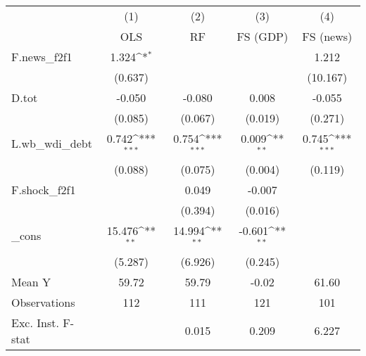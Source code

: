 {
\def\sym#1{\ifmmode^{#1}\else\(^{#1}\)\fi}
\begin{tabular}{l*{4}{c}}
\toprule
            &\multicolumn{1}{c}{(1)}&\multicolumn{1}{c}{(2)}&\multicolumn{1}{c}{(3)}&\multicolumn{1}{c}{(4)}\\
            &\multicolumn{1}{c}{OLS}&\multicolumn{1}{c}{RF}&\multicolumn{1}{c}{FS (GDP)}&\multicolumn{1}{c}{FS (news)}\\
\midrule
F.news\_f2f1 &       1.324\sym{*}  &                     &                     &       1.212         \\
            &     (0.637)         &                     &                     &    (10.167)         \\
\addlinespace
D.tot       &      -0.050         &      -0.080         &       0.008         &      -0.055         \\
            &     (0.085)         &     (0.067)         &     (0.019)         &     (0.271)         \\
\addlinespace
L.wb\_wdi\_debt&       0.742\sym{***}&       0.754\sym{***}&       0.009\sym{**} &       0.745\sym{***}\\
            &     (0.088)         &     (0.075)         &     (0.004)         &     (0.119)         \\
\addlinespace
F.shock\_f2f1&                     &       0.049         &      -0.007         &                     \\
            &                     &     (0.394)         &     (0.016)         &                     \\
\addlinespace
\_cons      &      15.476\sym{**} &      14.994\sym{**} &      -0.601\sym{**} &                     \\
            &     (5.287)         &     (6.926)         &     (0.245)         &                     \\
\midrule
Mean Y      &       59.72         &       59.79         &       -0.02         &       61.60         \\
Observations&         112         &         111         &         121         &         101         \\
Exc. Inst. F-stat&                     &       0.015         &       0.209         &       6.227         \\
\bottomrule
\end{tabular}
}
